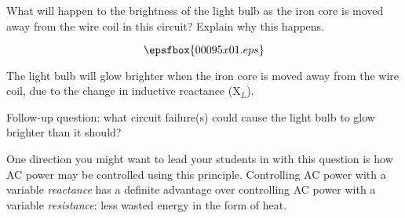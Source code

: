 

What will happen to the brightness of the light bulb as the iron core is moved away from the wire coil in this circuit?  Explain why this happens.

$$\epsfbox{00095x01.eps}$$







The light bulb will glow brighter when the iron core is moved away from the wire coil, due to the change in inductive reactance (X$_{L}$).

\vskip 10pt

Follow-up question: what circuit failure(s) could cause the light bulb to glow brighter than it should?







One direction you might want to lead your students in with this question is how AC power may be controlled using this principle.  Controlling AC power with a variable {\it reactance} has a definite advantage over controlling AC power with a variable {\it resistance}: less wasted energy in the form of heat.




